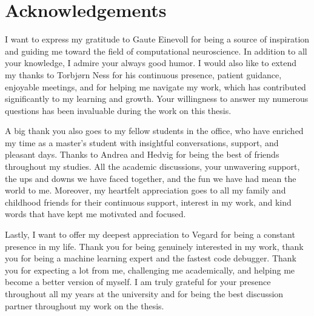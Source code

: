 \documentclass[a4paper, UKenglish, 11pt]{uiomaster}
\begin{document}
\chapter{Acknowledgements}
I want to express my gratitude to Gaute Einevoll for being a source of inspiration and guiding me toward the field of computational neuroscience. In addition to all your knowledge, I admire your always good humor. I would also like to extend my thanks to Torbjørn Ness for his continuous presence, patient guidance, enjoyable meetings, and for helping me navigate my work, which has contributed significantly to my learning and growth. Your willingness to answer my numerous questions has been invaluable during the work on this thesis.

A big thank you also goes to my fellow students in the office, who have enriched my time as a master's student with insightful conversations, support, and pleasant days. Thanks to Andrea and Hedvig for being the best of friends throughout my studies. All the academic discussions, your unwavering support, the ups and downs we have faced together, and the fun we have had mean the world to me. Moreover, my heartfelt appreciation goes to all my family and childhood friends for their continuous support, interest in my work, and kind words that have kept me motivated and focused.

Lastly, I want to offer my deepest appreciation to Vegard for being a constant presence in my life. Thank you for being genuinely interested in my work, thank you for being a machine learning expert and the fastest code debugger. Thank you for expecting a lot from me, challenging me academically, and helping me become a better version of myself. I am truly grateful for your presence throughout all my years at the university and for being the best discussion partner throughout my work on the thesis.
\end{document}
